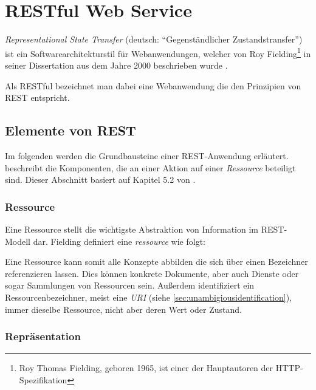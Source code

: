 \section{RESTful Web Service}

\emph{Representational State Transfer} (deutsch: \enquote{Gegenständlicher Zustandstransfer}) ist ein Softwarearchitekturstil für Webanwendungen, welcher von Roy Fielding\footnote{Roy Thomas Fielding, geboren 1965, ist einer der Hauptautoren der HTTP-Spezifikation} in seiner Dissertation aus dem Jahre 2000  beschrieben wurde \cite[Kapitel 5][95 ff.]{fieldingDissertation}. 

Als \gls{RESTful} bezeichnet man dabei eine Webanwendung die den Prinzipien von \gls{REST} entspricht. 

\subsection{Elemente von REST}

Im folgenden werden die Grundbausteine einer REST-Anwendung erläutert.  beschreibt die Komponenten, die an einer Aktion auf einer \emph{Ressource} beteiligt sind. Dieser Abschnitt basiert auf Kapitel 5.2 von \cite[][S. 86 ff.]{fieldingDissertation}.

\subsubsection{Ressource}

Eine Ressource stellt die wichtigste Abstraktion von Information im REST-Modell dar. Fielding definiert eine \emph{ressource} wie folgt:


Eine Ressource kann somit alle Konzepte abbilden die sich über einen Bezeichner referenzieren lassen. Dies können konkrete Dokumente, aber auch Dienste oder sogar Sammlungen von Ressourcen sein.
Außerdem identifiziert ein Ressourcenbezeichner, meist eine \emph{URI} (siehe \cref{sec:unambigiousidentification}), immer dieselbe Ressource, nicht aber deren Wert oder Zustand.

\subsubsection{Repräsentation}

